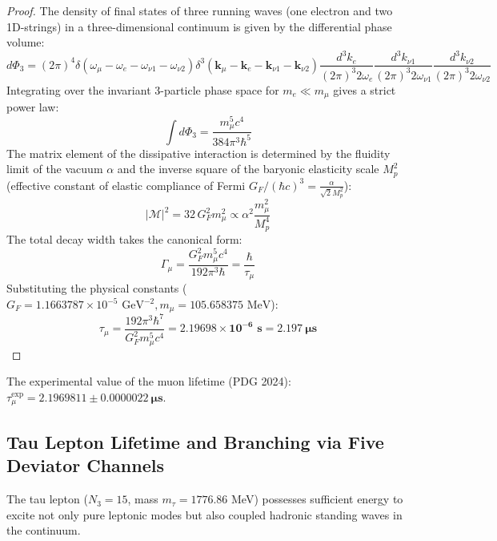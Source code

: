 \documentclass[12pt,a4paper]{article}
\begin{document}
		\begin{proof}
			The density of final states of three running waves (one electron and two 1D-strings) in a three-dimensional continuum is given by the differential phase volume:
			\begin{equation}
				d\Phi_3 = (2\pi)^4 \delta\left( \omega_\mu - \omega_e - \omega_{\nu 1} - \omega_{\nu 2} \right) \delta^3\left( \mathbf{k}_\mu - \mathbf{k}_e - \mathbf{k}_{\nu 1} - \mathbf{k}_{\nu 2} \right) \frac{d^3k_e}{(2\pi)^3 2\omega_e} \frac{d^3k_{\nu 1}}{(2\pi)^3 2\omega_{\nu 1}} \frac{d^3k_{\nu 2}}{(2\pi)^3 2\omega_{\nu 2}}
			\end{equation}
			Integrating over the invariant 3-particle phase space for $m_e \ll m_\mu$ gives a strict power law:
			\begin{equation}
				\int d\Phi_3 = \frac{m_\mu^5 c^4}{384 \pi^3 \hbar^5}
			\end{equation}
			The matrix element of the dissipative interaction is determined by the fluidity limit of the vacuum $\alpha$ and the inverse square of the baryonic elasticity scale $M_p^2$ (effective constant of elastic compliance of Fermi $G_F / (\hbar c)^3 = \frac{\alpha}{\sqrt{2} M_p^2}$):
			\begin{equation}
				|\mathcal{M}|^2 = 32 \, G_F^2 m_\mu^2 \propto \alpha^2 \frac{m_\mu^2}{M_p^4}
			\end{equation}
			The total decay width takes the canonical form:
			\begin{equation}
				\Gamma_\mu = \frac{G_F^2 m_\mu^5 c^4}{192 \pi^3 \hbar} = \frac{\hbar}{\tau_\mu}
			\end{equation}
			Substituting the physical constants ($G_F = 1.1663787 \times 10^{-5} \text{ GeV}^{-2}, m_\mu = 105.658375 \text{ MeV}$):
			\begin{equation}
				\tau_\mu = \frac{192 \pi^3 \hbar^7}{G_F^2 m_\mu^5 c^4} = \mathbf{2.19698 \times 10^{-6} \text{ s}} = \mathbf{2.197 \ \mu\text{s}}
			\end{equation}
		\end{proof}
		The experimental value of the muon lifetime (PDG 2024):\\ $\tau_\mu^{\text{exp}} = \mathbf{2.1969811 \pm 0.0000022 \ \mu\text{s}}$.
		
		\subsection{Tau Lepton Lifetime and Branching via Five Deviator Channels}
		The tau lepton ($N_3=15$, mass $m_\tau = 1776.86$ MeV) possesses sufficient energy to excite not only pure leptonic modes but also coupled hadronic standing waves in the continuum.
		
\end{document}
